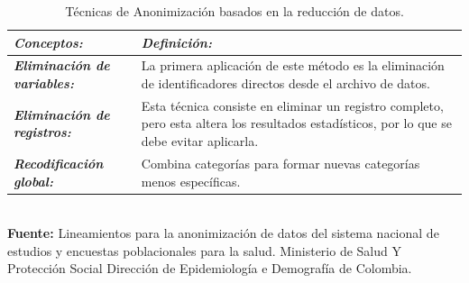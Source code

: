 \documentclass[a4paper,openright,12pt]{book}
\theoremstyle{definition}
\theoremstyle{remark}
\begin{document}
\begin{table}[htbp]
\centering
\caption{Técnicas de Anonimización basados en la reducción de datos.}
\begin{tabular}{>{\centering\arraybackslash}m{3cm} >{\arraybackslash}m{10cm} }
\hline
\textbf{\textit{Conceptos:}} & \textbf{\textit{Definición:}} \\ \hline
\textbf{\textit{Eliminación de variables:}} & La primera aplicación de este método es la eliminación de identificadores directos desde el archivo de datos. \\ \hline
\textbf{\textit{Eliminación de registros:}} & Esta técnica consiste en eliminar un registro completo, pero esta altera los resultados estadísticos, por lo que se debe evitar aplicarla.  \\ \hline
\textbf{\textit{Recodificación global:}} & Combina categorías para formar nuevas categorías menos específicas. \\ \hline
\end{tabular}
\label{tabla:RobustezPropiedades}
\\\textbf{Fuente:} Lineamientos para la anonimización de datos del sistema nacional de estudios y encuestas poblacionales para la salud. Ministerio de Salud Y Protección Social Dirección de Epidemiología e Demografía de Colombia.
\end{table}
\end{document}
